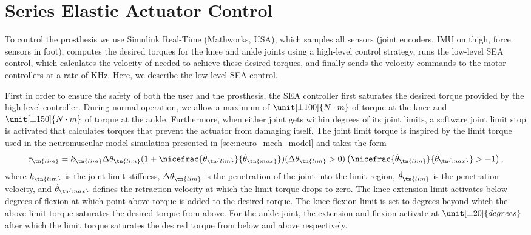 \section{Series Elastic Actuator Control}\label{sec:sea_control}

To control the prosthesis we use Simulink Real-Time (Mathworks, USA), which
samples all sensors (joint encoders, IMU on thigh, force sensors in foot),
computes the desired torques for the knee and ankle joints using a high-level
control strategy, runs the low-level SEA control, which calculates the velocity
of needed to achieve these desired torques, and finally sends the velocity
commands to the motor controllers at a rate of \unit[1]{KHz}. Here, we describe
the low-level SEA control.

First in order to ensure the safety of both the user and the prosthesis, the SEA
controller first saturates the desired torque provided by the high level
controller. During normal operation, we allow a maximum of $\unit[\pm 100]{N
\cdot m}$ of torque at the knee and $\unit[\pm 150]{N \cdot m}$ of torque at the
ankle. Furthermore, when either joint gets within \unit[5]{degrees} of its joint
limits, a software joint limit stop is activated that calculates torques that
prevent the actuator from damaging itself. The joint limit torque is inspired by
the limit torque used in the neuromuscular model simulation presented in
\cref{sec:neuro_mech_model} and takes the form
\begin{align}
    \tau_\tn{lim} = k_\tn{lim} \Delta \theta_\tn{lim} 
    (1 + \nicefrac{\dot \theta_\tn{lim}}{\dot \theta_\tn{max}}) 
    (\Delta \theta_\tn{lim}  > 0) 
    \left(\nicefrac{\dot \theta_\tn{lim}}{\dot \theta_\tn{max}} > -1 \right), 
    \label{eq:tau_joint_limit_pros}
\end{align}
where $k_\tn{lim}$ is the joint limit stiffness, $\Delta \theta_\tn{lim}$ is the
penetration of the joint into the limit region, $\dot \theta_\tn{lim}$ is the
penetration velocity, and $\dot \theta_\tn{max}$ defines the retraction
velocity at which the limit torque drops to zero. The knee extension limit
activates below \unit[5]{degrees} of flexion at which point above torque is
added to the desired torque. The knee flexion limit is set to
\unit[90]{degrees} beyond which the above limit torque saturates the desired
torque from above. For the ankle joint, the extension and flexion activate at
$\unit[\pm 20]{degrees}$ after which the limit torque saturates the desired
torque from below and above respectively. 

